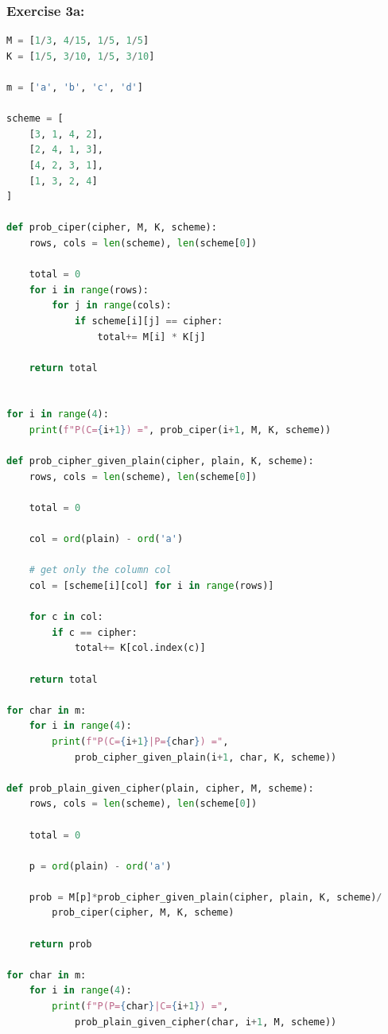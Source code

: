 \documentclass[10pt, oneside]{article}
\begin{document}
\subsubsection{Exercise 3a:}
\label{3a-code}
\begin{lstlisting}[language=Python]
M = [1/3, 4/15, 1/5, 1/5]
K = [1/5, 3/10, 1/5, 3/10]
    
m = ['a', 'b', 'c', 'd']
    
scheme = [
    [3, 1, 4, 2],
    [2, 4, 1, 3],
    [4, 2, 3, 1],
    [1, 3, 2, 4]
]

def prob_ciper(cipher, M, K, scheme):
    rows, cols = len(scheme), len(scheme[0])

    total = 0
    for i in range(rows):
        for j in range(cols):
            if scheme[i][j] == cipher:
                total+= M[i] * K[j]

    return total


for i in range(4):
    print(f"P(C={i+1}) =", prob_ciper(i+1, M, K, scheme))

def prob_cipher_given_plain(cipher, plain, K, scheme):
    rows, cols = len(scheme), len(scheme[0])

    total = 0

    col = ord(plain) - ord('a')

    # get only the column col
    col = [scheme[i][col] for i in range(rows)]

    for c in col:
        if c == cipher:
            total+= K[col.index(c)]

    return total

for char in m:
    for i in range(4):
        print(f"P(C={i+1}|P={char}) =", 
            prob_cipher_given_plain(i+1, char, K, scheme))

def prob_plain_given_cipher(plain, cipher, M, scheme):
    rows, cols = len(scheme), len(scheme[0])
    
    total = 0
    
    p = ord(plain) - ord('a')
    
    prob = M[p]*prob_cipher_given_plain(cipher, plain, K, scheme)/
        prob_ciper(cipher, M, K, scheme)
    
    return prob
    
for char in m:
    for i in range(4):
        print(f"P(P={char}|C={i+1}) =", 
            prob_plain_given_cipher(char, i+1, M, scheme))
\end{lstlisting}
\end{document}
